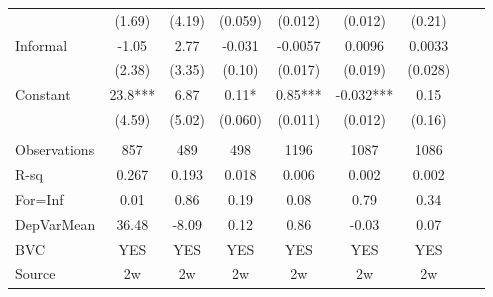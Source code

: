 \begin{tabular}{lcccccccc}
      & (1.69) & (4.19) & (0.059) & (0.012) & (0.012) & (0.21) &       &  \\
Informal & -1.05 & 2.77  & -0.031 & -0.0057 & 0.0096 & 0.0033 &       &  \\
      & (2.38) & (3.35) & (0.10) & (0.017) & (0.019) & (0.028) &       &  \\
Constant & 23.8*** & 6.87  & 0.11* & 0.85*** & -0.032*** & 0.15  &       &  \\
      & (4.59) & (5.02) & (0.060) & (0.011) & (0.012) & (0.16) &       &  \\
      &       &       &       &       &       &       &       &  \\
\cmidrule{1-7}Observations & 857   & 489   & 498   & 1196  & 1087  & 1086  &       &  \\
R-sq  & 0.267 & 0.193 & 0.018 & 0.006 & 0.002 & 0.002 &       &  \\
For=Inf & 0.01  & 0.86  & 0.19  & 0.08  & 0.79  & 0.34  &       &  \\
DepVarMean & 36.48 & -8.09 & 0.12  & 0.86  & -0.03 & 0.07  &       &  \\
BVC   & YES   & YES   & YES   & YES   & YES   & YES   &       &  \\
Source & 2w    & 2w    & 2w    & 2w    & 2w    & 2w    &       &  \\
\cmidrule{1-7}\end{tabular}%
